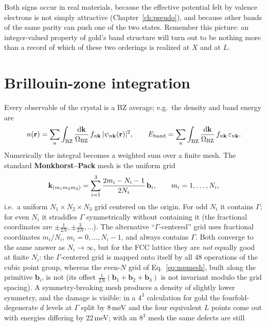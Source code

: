 Both signs occur in real materials, because the effective potential felt by
valence electrons is not simply attractive (Chapter~\ref{ch:pseudo}), and
because other bands of the same parity can push one of the two states.
Remember this picture: an integer-valued property of gold's band structure
will turn out to be nothing more than a record of which of these two
orderings is realized at $X$ and at $L$.

\section{Brillouin-zone integration}
\label{sec:bzintegration}

Every observable of the crystal is a BZ average; e.g.\ the density and
band energy are
\begin{equation}
n(\mathbf{r}) = \sum_n \int_{\mathrm{BZ}} \frac{\mathrm{d}\mathbf{k}}{\Omega_{\mathrm{BZ}}}\,
f_{n\mathbf{k}}\, |\psi_{n\mathbf{k}}(\mathbf{r})|^2,
\qquad
E_{\mathrm{band}} = \sum_n \int_{\mathrm{BZ}}
\frac{\mathrm{d}\mathbf{k}}{\Omega_{\mathrm{BZ}}}\, f_{n\mathbf{k}}\, \varepsilon_{n\mathbf{k}}.
\end{equation}
Numerically the integral becomes a weighted sum over a finite mesh. The
standard \textbf{Monkhorst--Pack} mesh is the uniform grid
\begin{equation}
\mathbf{k}_{(m_1 m_2 m_3)} = \sum_{i=1}^{3} \frac{2 m_i - N_i - 1}{2 N_i}\,
\mathbf b_i,
\qquad m_i = 1, \dots, N_i,
\label{eq:mpmesh}
\end{equation}
i.e.\ a uniform $N_1{\times}N_2{\times}N_3$ grid centered on the origin. For
odd $N_i$ it contains $\Gamma$; for even $N_i$ it straddles $\Gamma$
symmetrically without containing it (the fractional coordinates are
$\pm\tfrac{1}{2N}, \pm\tfrac{3}{2N}, \dots$). The alternative
``$\Gamma$-centered'' grid uses fractional coordinates $m_i/N_i$,
$m_i = 0,\dots,N_i{-}1$, and always contains $\Gamma$. Both converge to
the same answer as $N_i\to\infty$, but for the FCC lattice they are
\emph{not} equally good at finite $N_i$: the $\Gamma$-centered grid is
mapped onto itself by all 48 operations of the cubic point group, whereas
the even-$N$ grid of Eq.~\eqref{eq:mpmesh}, built along the primitive
$\mathbf b_i$, is not (its offset
$\tfrac{1}{2N}(\mathbf b_1{+}\mathbf b_2{+}\mathbf b_3)$ is not invariant
modulo the grid spacing). A symmetry-breaking mesh produces a density of
slightly lower symmetry, and the damage is visible: in a $4^3$
calculation for gold the fourfold-degenerate $d$ levels at $\Gamma$ split
by $8$\,meV and the four equivalent $L$ points come out with energies
differing by $22$\,meV; with an $8^3$ mesh the same defects are still
